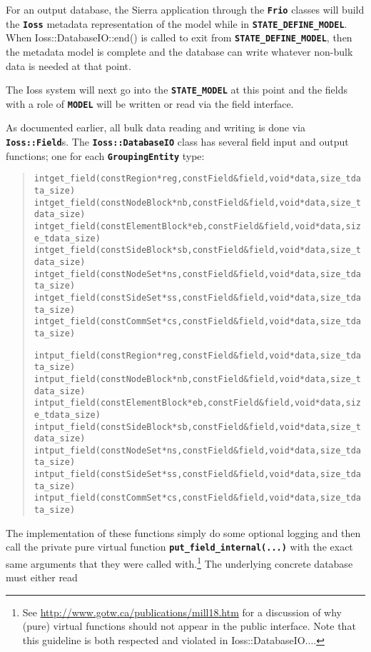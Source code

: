 \documentclass[11pt,twoside]{article}
\newcommand{\code}[1]
   {\mbox{\bf\tt #1}\null}
\newenvironment{source}
{\small\begin{quote}\begin{alltt}}
{\end{alltt}\end{quote}\normalsize}
\begin{document}
For an output database, the Sierra application through the
\code{Frio} classes will build the \code{Ioss}
metadata representation of the model while in
\code{STATE\_DEFINE\_MODEL}. When Ioss::DatabaseIO::end() is
called to exit from \code{STATE\_DEFINE\_MODEL}, then the
metadata model is complete and the database can write whatever
non{}-bulk data is needed at that point.

The Ioss system will next go into the \code{STATE\_MODEL} at
this point and the fields with a role of \code{MODEL} will be
written or read via the field interface.

As documented earlier, all bulk data reading and writing is done via
\code{Ioss::Field}s. The \code{Ioss::DatabaseIO}
class has several field input and output functions; one for each
\code{GroupingEntity} type:
\begin{source}
int  get\_field (const Region *reg, const Field \&field, void *data, size\_t data\_size)
int  get\_field (const NodeBlock *nb, const Field \&field, void *data, size\_t data\_size)
int  get\_field (const ElementBlock *eb, const Field \&field, void *data, size\_t data\_size)
int  get\_field (const SideBlock *sb, const Field \&field, void *data, size\_t data\_size)
int  get\_field (const NodeSet *ns, const Field \&field, void *data, size\_t data\_size)
int  get\_field (const SideSet *ss, const Field \&field, void *data, size\_t data\_size)
int  get\_field (const CommSet *cs, const Field \&field, void *data, size\_t data\_size)

int  put\_field (const Region *reg, const Field \&field, void *data, size\_t data\_size)
int  put\_field (const NodeBlock *nb, const Field \&field, void *data, size\_t data\_size)
int  put\_field (const ElementBlock *eb, const Field \&field, void *data, size\_t data\_size)
int  put\_field (const SideBlock *sb, const Field \&field, void *data, size\_t data\_size)
int  put\_field (const NodeSet *ns, const Field \&field, void *data, size\_t data\_size)
int  put\_field (const SideSet *ss, const Field \&field, void *data, size\_t data\_size)
int  put\_field (const CommSet *cs, const Field \&field, void *data, size\_t data\_size)
\end{source}
The implementation of these functions simply do some optional logging
and then call the private pure virtual function
\code{put\_field\_internal(...)} with the exact same
arguments that they were called with.\footnote{See
\url{http://www.gotw.ca/publications/mill18.htm} for a discussion of why
(pure) virtual functions should not appear in the public interface.
Note that this guideline is both respected and violated in
Ioss::DatabaseIO....} The underlying concrete database must either read
\end{document}

